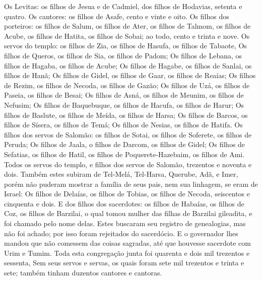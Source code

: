 {  Os Levitas: os filhos de Jesua e de Cadmiel, dos filhos de Hodavias, setenta e quatro.
  Os cantores: os filhos de Asafe, cento e vinte e oito.
  Os filhos dos porteiros: os filhos de Salum, os filhos de Ater, os filhos de Talmom, os filhos de Acube, os filhos de Hatita, os filhos de Sobai; ao todo, cento e trinta e nove.
  Os servos do templo: os filhos de Zia, os filhos de Hasufa, os filhos de Tabaote,
  Os filhos de Queros, os filhos de Sia, os filhos de Padom;
  Os filhos de Lebana, os filhos de Hagaba, os filhos de Acube;
  Os filhos de Hagabe, os filhos de Sanlai, os filhos de Hanã;
  Os filhos de Gidel, os filhos de Gaar, os filhos de Reaías;
  Os filhos de Rezim, os filhos de Necoda, os filhos de Gazão;
  Os filhos de Uzá, os filhos de Paseia, os filhos de Besai;
  Os filhos de Asná, os filhos de Meunim, os filhos de Nefusim;
  Os filhos de Baquebuque, os filhos de Hacufa, os filhos de Harur;
  Os filhos de Baslute, os filhos de Meída, os filhos de Harsa;
  Os filhos de Barcos, os filhos de Sísera, os filhos de Temá;
  Os filhos de Nesias, os filhos de Hatifa.
  Os filhos dos servos de Salomão: os filhos de Sotai, os filhos de Soferete, os filhos de Peruda;
  Os filhos de Jaala, o filhos de Darcom, os filhos de Gidel;
  Os filhos de Sefatias, os filhos de Hatil, os filhos de Poquerete-Hazebaim, os filhos de Ami.
  Todos os servos do templo, e filhos dos servos de Salomão, trezentos e noventa e dois.
  Também estes subiram de Tel-Melá, Tel-Harsa, Querube, Adã, e Imer, porém não puderam mostrar a família de seus pais, nem sua linhagem, se eram de Israel:
  Os filhos de Delaías, os filhos de Tobias, os filhos de Necoda, seiscentos e cinquenta e dois.
  E dos filhos dos sacerdotes: os filhos de Habaías, os filhos de Coz, os filhos de Barzilai, o qual tomou mulher das filhas de Barzilai gileadita, e foi chamado pelo nome delas.
  Estes buscaram seu registro de genealogias, mas não foi achado; por isso foram rejeitados do sacerdócio.
  E o governador lhes mandou que não comessem das coisas sagradas, até que houvesse sacerdote com Urim e Tumim.
  Toda esta congregação junta foi quarenta e dois mil trezentos e sessenta,
  Sem seus servos e servas, os quais foram sete mil trezentos e trinta e sete; também tinham duzentos cantores e cantoras. %
}
